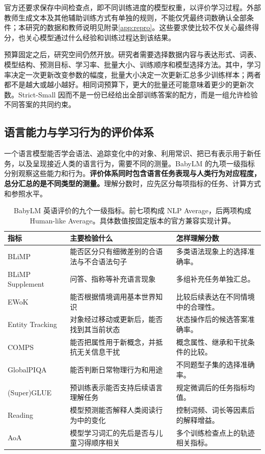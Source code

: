 官方还要求保存中间检查点，即不同训练进度的模型权重，以评价学习过程。外部教师生成文本及其他辅助训练方式有单独的规则，不能仅凭最终词数确认全部条件；本研究的数据和教师说明见附录\ref{app:repro}。这些要求使比较不仅关心最终得分，也关心模型通过什么经验和训练过程达到该结果。

预算固定之后，研究空间仍然开放。研究者需要选择数据内容与表达形式、词表、模型结构、预测目标、学习率、批量大小、训练顺序和模型选择方法。其中，学习率决定一次更新改变参数的幅度，批量大小决定一次更新汇总多少训练样本；两者都不是越大或越小越好。相同词预算下，更大的批量还可能意味着更少的更新次数。Strict-Small 因而不是一份已经给出全部训练答案的配方，而是一组允许检验不同答案的共同约束。

\subsection{语言能力与学习行为的评价体系}

一个语言模型能否学会语法、追踪变化中的对象、利用常识、把已有表示用于新任务，以及呈现接近人类的语言行为，需要不同的测量。BabyLM 的九项一级指标分别观察这些能力和行为。\textbf{评价体系同时包含语言任务表现与人类行为对应程度，总分汇总的是不同类型的测量。}理解分数时，应先区分每项指标的任务、计算方式和参照水平。

\begin{table}[htbp]
\caption{BabyLM 英语评价的九个一级指标。前七项构成 NLP Average，后两项构成 Human-like Average。具体数值按固定版本的官方兼容实现计算。}
\label{tab:metrics}
\small
\begin{tabularx}{\linewidth}{@{}P{31mm}Y Y@{}}
\toprule 指标 & 主要检验什么 & 怎样理解分数\\\midrule
BLiMP & 能否区分只有细微差别的合语法与不合语法句子 & 多类语法现象上的选择准确率。\\
BLiMP Supplement & 问答、指称等补充语言现象 & 多组补充任务单独汇总。\\
EWoK & 能否根据情境调用基本世界知识 & 比较后续表达在不同情境中的合理性。\\
Entity Tracking & 对象经过移动或更新后，能否找到其当前状态 & 状态操作后的候选答案准确率。\\
COMPS & 能否把属性用于新概念，并抵抗无关信息干扰 & 概念属性、继承和干扰条件的比较。\\
GlobalPIQA & 能否判断日常物理行为和用途 & 不同题型子集的选择准确率。\\
(Super)GLUE & 预训练表示能否支持后续语言理解任务 & 规定微调后的任务指标均值。\\
Reading & 模型预测能否解释人类阅读行为中的变化 & 控制词频、词长等因素后的解释增益。\\
AoA & 模型学习词汇的先后是否与儿童习得顺序相关 & 多个训练检查点上的轨迹相关指标。\\
\bottomrule
\end{tabularx}
\end{table}

